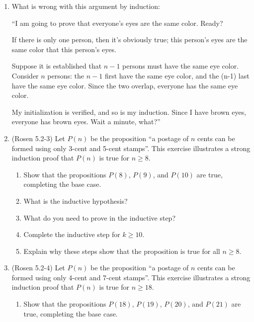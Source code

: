 \begin{enumerate}
\item \strmedium What is wrong with this argument by induction: 

``I am going to prove that everyone's eyes are the same color. Ready?

If there is only one person, then it's obviously true; this person's eyes are the same color that this person's eyes.

Suppose it is established that $n-1$ persons must have the same eye color. Consider $n$ persons: the $n-1$ first have the same eye color, and the (n-1) last have the same eye color. Since the two overlap, everyone has the same eye color.

My initialization is verified, and so is my induction. Since I have brown eyes, everyone has brown eyes. Wait a minute, what?''

\item (Rosen 5.2-3) Let $P(n)$ be the proposition ``a postage of $n$ cents can be formed using only 3-cent and 5-cent stamps''. This exercise illustrates a strong induction proof that $P(n)$ is true for $n \geq 8$.

\begin{enumerate}
\item \streasy Show that the propositions $P(8)$, $P(9)$, and $P(10)$ are true, completing the base case.

\item \streasy What is the inductive hypothesis?

\item \streasy What do you need to prove in the inductive step?

\item \strhard Complete the inductive step for $k \geq 10$.
  
\item \strmedium Explain why these steps show that the proposition is true for all $n \geq 8$.
\end{enumerate}

\item (Rosen 5.2-4) Let $P(n)$ be the proposition ``a postage of $n$ cents can be formed using only 4-cent and 7-cent stamps''. This exercise illustrates a strong induction proof that $P(n)$ is true for $n \geq 18$.

\begin{enumerate}
\item \streasy Show that the propositions $P(18)$, $P(19)$, $P(20)$, and $P(21)$ are true, completing the base case.


\end{enumerate}
\end{enumerate}
